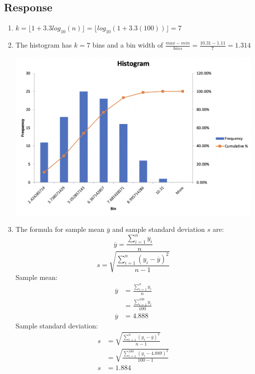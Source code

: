 \documentclass[13pt]{article}
\begin{document}
\subsection*{Response}
\begin{enumerate}[label=\alph*)]
\item $k = \lfloor 1 + 3.3log_{10}(n) \rfloor = \lfloor log_{10}(1 + 3.3(100)) \rfloor = 7$

\item The histogram has $k = 7$ bins and a bin width of $\frac{max - min}{bins} = \frac{10.31 - 1.11}{7} = 1.314$ \\
  \begin{center}
    \includegraphics[scale=0.6]{figures/histogram.png}    
  \end{center}

\item The formula for sample mean $\overline{y}$ and sample standard deviation $s$ are:
  \[\overline{y} = \frac{\sum_{i = 1}^{n} y_i}{n}\]
  \[s = \sqrt{\frac{\sum_{i = 1}^{n} (y_i - \overline{y})^2}{n - 1}}\]
  Sample mean:
  \begin{align*}
    \overline{y} &= \frac{\sum_{i = 1}^{n} y_i}{n} \\
                 &= \frac{\sum_{i = 1}^{100}y_i}{100} \\
    \overline{y} &= 4.888
  \end{align*}
  Sample standard deviation:
  \begin{align*}
    s &= \sqrt{\frac{\sum_{i = 1}^{n} (y_i - \overline{y})^2}{n - 1}} \\
      &= \sqrt{\frac{\sum_{i = 1}^{100} (y_i - 4.889)^2}{100 - 1}} \\
    s &= 1.884
  \end{align*}
\end{enumerate}
\end{document}
